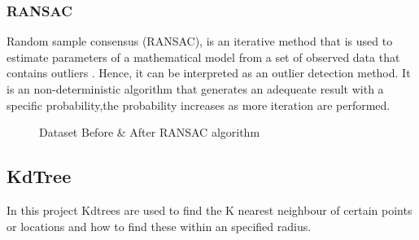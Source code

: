 \documentclass[12pt]{report}
\begin{document}
\subsubsection*{RANSAC}
Random sample consensus (RANSAC), is an iterative method that is used to estimate parameters of a mathematical model from a set of observed data that contains outliers .
Hence, it can be interpreted as an outlier detection method. It is an non-deterministic algorithm that generates an adequeate result with a specific probability,the probability increases as more iteration are performed.

\begin{figure}[H]%
  \centering
  \qquad
  \caption{Dataset Before \& After RANSAC algorithm }%
  \label{fig:example}%
\end{figure}


\subsection {KdTree}
In this project Kdtrees are used to find the K nearest neighbour of certain points or locations and how to find these within an specified radius.
\end{document}
